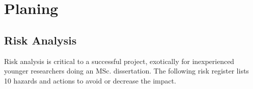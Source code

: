 \chapter{Planing}

\section{Risk Analysis}
Risk analysis is critical to a successful project, exotically for inexperienced younger researchers doing an MSc. dissertation. The following risk register lists 10 hazards and actions to avoid or decrease the impact. 

